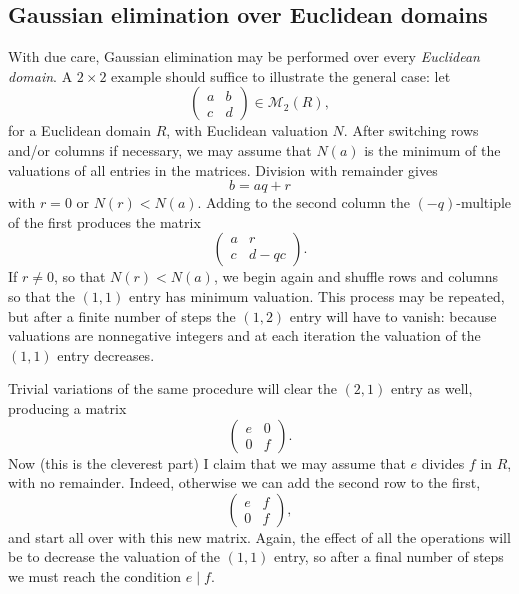 \subsection{Gaussian elimination over Euclidean domains}
\label{subsec:linalg:gaussian-elimination-over-euclidean-domains}
With due care, Gaussian elimination may be performed over every
\emph{Euclidean domain}. A $2 \times 2$ example should suffice to
illustrate the general case: let
\[
  \begin{pmatrix} a & b \\ c & d \end{pmatrix} \in \mathcal{M}_2(R),
\]
for a Euclidean domain $R$, with Euclidean valuation $N$. After
switching rows and/or columns if necessary, we may assume that $N(a)$
is the minimum of the valuations of all entries in the
matrices. Division with remainder gives
\[
  b = aq + r
\]
with $r = 0$ or $N(r) < N(a)$. Adding to the second column the
$(-q)$-multiple of the first produces the matrix
\[
  \begin{pmatrix} a & r \\ c & d - qc \end{pmatrix}.
\]
If $r \neq 0$, so that $N(r) < N(a)$, we begin again and shuffle rows
and columns so that the $(1,1)$ entry has minimum valuation. This
process may be repeated, but after a finite number of steps the
$(1,2)$ entry will have to vanish: because valuations are nonnegative
integers and at each iteration the valuation of the $(1,1)$ entry
decreases.

Trivial variations of the same procedure will clear the $(2,1)$ entry
as well, producing a matrix
\[
  \begin{pmatrix} e & 0 \\ 0 & f \end{pmatrix}.
\]
Now (this is the cleverest part) I claim that we may assume that $e$
divides $f$ in $R$, with no remainder. Indeed, otherwise we can add
the second row to the first,
\[
  \begin{pmatrix} e & f \\ 0 & f \end{pmatrix},
\]
and start all over with this new matrix. Again, the effect of all the
operations will be to decrease the valuation of the $(1,1)$ entry, so
after a final number of steps we must reach the condition $e \mid f$.

